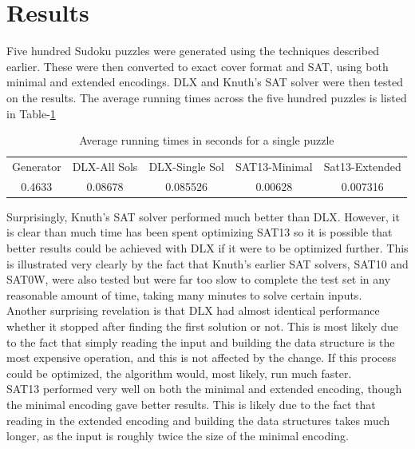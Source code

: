 \documentclass[12pt]{article}
\begin{document}
\section{Results}
Five hundred Sudoku puzzles were generated using the techniques described earlier. These were then converted to exact cover format and SAT, using both minimal and extended encodings. DLX and Knuth's SAT solver were then tested on the results. The average running times across the five hundred puzzles is listed in Table-\ref{table:runningtime}

\begin{table}[H]
\begin{center}
\begin{adjustwidth}{-0.7cm}{}
\begin{tabular}{ccccc}
Generator & DLX-All Sols & DLX-Single Sol & SAT13-Minimal & Sat13-Extended\\
0.4633 & 0.08678 & 0.085526 & 0.00628 & 0.007316
\end{tabular}
\caption{Average running times in seconds for a single puzzle}
\label{table:runningtime}
\end{adjustwidth}
\end{center}
\end{table}

Surprisingly, Knuth's SAT solver performed much better than DLX. However, it is clear than much time has been spent optimizing SAT13 so it is possible that better results could be achieved with DLX if it were to be optimized further. This is illustrated very clearly by the fact that Knuth's earlier SAT solvers, SAT10 and SAT0W, were also tested but were far too slow to complete the test set in any reasonable amount of time, taking many minutes to solve certain inputs. \\

Another surprising revelation is that DLX had almost identical performance whether it stopped after finding the first solution or not. This is most likely due to the fact that simply reading the input and building the data structure is the most expensive operation, and this is not affected by the change. If this process could be optimized, the algorithm would, most likely, run much faster. \\

SAT13 performed very well on both the minimal and extended encoding, though the minimal encoding gave better results. This is likely due to the fact that reading in the extended encoding and building the data structures takes much longer, as the input is roughly twice the size of the minimal encoding. 
\end{document}
